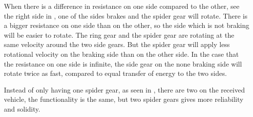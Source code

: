When there is a difference in resistance on one side compared to the other, see the right side in , one of the sides brakes and the spider gear will rotate. There is a bigger resistance on one side than on the other, so the side which is not braking will be easier to rotate. The ring gear and the spider gear are rotating at the same velocity around the two side gears. But the spider gear will apply less rotational velocity on the braking side than on the other side. In the case that the resistance on one side is infinite, the side gear on the none braking side will rotate twice as fast, compared to equal transfer of energy to the two sides.

Instead of only having one spider gear, as seen in , there are two on the received vehicle, the functionality is the same, but two spider gears gives more reliability and solidity. 







